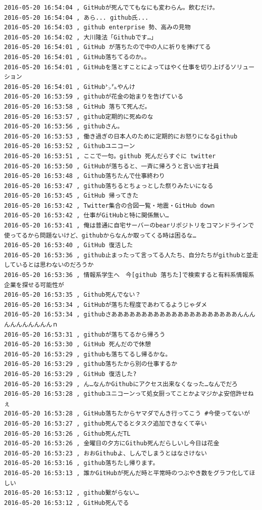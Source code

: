 \begin{verbatim}
2016-05-20 16:54:04 , GitHubが死んでてもなにも変わらん。飲むだけ。
2016-05-20 16:54:04 , あら... github氏...
2016-05-20 16:54:03 , github enterprise 勢、高みの見物
2016-05-20 16:54:02 , 大川隆法「Githubです…」
2016-05-20 16:54:01 , GitHub が落ちたので中の人に祈りを捧げてる
2016-05-20 16:54:01 , GitHub落ちてるのか。。
2016-05-20 16:54:01 , GitHubを落とすことによってはやく仕事を切り上げるソリューション
2016-05-20 16:54:01 , GitHub㌧㌦やんけ
2016-05-20 16:53:59 , githubが花金の始まりを告げている
2016-05-20 16:53:58 , GitHub 落ちて死んだ。
2016-05-20 16:53:57 , github定期的に死ぬのな
2016-05-20 16:53:56 , githubさん。
2016-05-20 16:53:53 , 働き過ぎの日本人のために定期的にお怒りになるgithub
2016-05-20 16:53:52 , Githubユニコーン
2016-05-20 16:53:51 , ここで一句。github 死んだらすぐに twitter
2016-05-20 16:53:50 , GitHubが落ちると、一斉に帰ろうと言い出す社員
2016-05-20 16:53:48 , Github落ちたんで仕事終わり
2016-05-20 16:53:47 , github落ちるとちょっとした祭りみたいになる
2016-05-20 16:53:45 , GitHub 帰ってきた
2016-05-20 16:53:42 , Twitter集合の合図一覧・地震・GitHub down
2016-05-20 16:53:42 , 仕事がGitHubと特に関係無い…
2016-05-20 16:53:41 , 俺は普通に自宅サーバーのbearリポジトリをコマンドラインで使ってるから問題ないけど、githubからなんか取ってくる時は困るな…
2016-05-20 16:53:40 , GitHub 復活した
2016-05-20 16:53:36 , github止まったって言ってる人たち、自分たちがgithubと並走しているとは思わないのだろうか
2016-05-20 16:53:36 , 情報系学生へ　今[github 落ちた]で検索すると有料系情報系企業を探せる可能性が
2016-05-20 16:53:35 , Github死んでない？
2016-05-20 16:53:34 , GitHubが落ちた程度であわてるようじゃダメ
2016-05-20 16:53:34 , githubさあああああああああああああああああああああんんんんんんんんんんんｎ
2016-05-20 16:53:31 , githubが落ちてるから帰ろう
2016-05-20 16:53:30 , GitHub 死んだので休憩
2016-05-20 16:53:29 , githubも落ちてるし帰るかな。
2016-05-20 16:53:29 , github落ちたから別の仕事するか
2016-05-20 16:53:29 , GitHub 復活した?
2016-05-20 16:53:29 , ん…なんかGithubにアクセス出来なくなった…なんでだろ
2016-05-20 16:53:28 , githubユニコーンって処女厨ってことかよマジかよ安倍許せねぇ
2016-05-20 16:53:28 , GitHub落ちたからヤマダでんき行ってこう #今使ってないが
2016-05-20 16:53:27 , github死んでるとタスク追加できなくて辛い
2016-05-20 16:53:26 , Github死んだTL
2016-05-20 16:53:26 , 金曜日の夕方にGithub死んだらしいし今日は花金
2016-05-20 16:53:23 , おおGithubよ、しんでしまうとはなさけない
2016-05-20 16:53:16 , github落ちたし帰ります。
2016-05-20 16:53:13 , 誰かGitHubが死んだ時と平常時のつぶやき数をグラフ化してほしい
2016-05-20 16:53:12 , github繋がらない…
2016-05-20 16:53:12 , GitHub死んでる

\end{verbatim}
